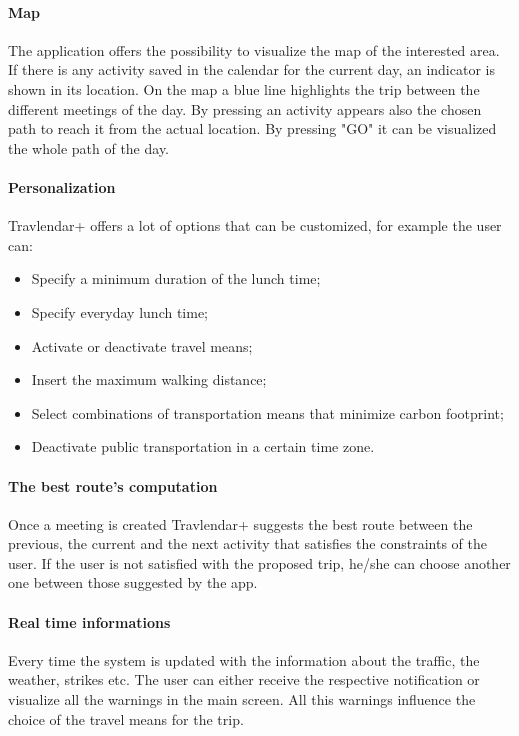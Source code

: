 \documentclass[12pt,titlepage]{article}
\begin{document}
\paragraph{Map}
The application offers the possibility to visualize the map of the interested area. If there is any activity saved in the calendar for the current day, an indicator is shown in its location. On the map a blue line highlights the trip between the different meetings of the day. By pressing an activity appears also the chosen path to reach it from the actual location. By pressing "GO" it can be visualized the whole path of the day.

\paragraph{Personalization}
Travlendar+ offers a lot of options that can be customized, for example the user can:
\begin{itemize}
\item{Specify a minimum duration of the lunch time;}
\item {Specify everyday lunch time;}
\item{Activate or deactivate travel means;}
\item{Insert the maximum walking distance;}
\item{Select combinations of transportation means that minimize carbon footprint;}
\item{Deactivate public transportation in a certain time zone.}
\end{itemize}

\paragraph{The best route's computation}
Once a meeting is created Travlendar+ suggests the best route between the previous, the current and the next activity that satisfies the constraints of the user. If the user is not satisfied with the proposed trip, he/she can choose another one between those suggested by the app.

\paragraph{Real time informations}
Every time the system is updated with the information about the traffic, the weather, strikes etc. The user can either receive the respective notification or visualize all the warnings in the main screen. All this warnings influence the choice of the travel means for the trip. 
\end{document}
